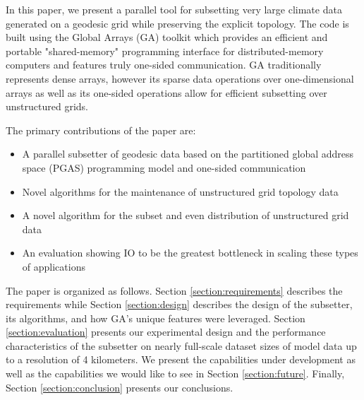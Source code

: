 In this paper, we present a parallel tool for subsetting very large climate
data generated on a geodesic grid while preserving the explicit topology.  The
code is built using the Global Arrays (GA) toolkit\cite{GA} which provides an
efficient and portable "shared-memory" programming interface for
distributed-memory computers and features truly one-sided communication.  GA
traditionally represents dense arrays, however its sparse data operations over
one-dimensional arrays as well as its one-sided operations allow for efficient
subsetting over unstructured grids.

The primary contributions of the paper are:
\begin{itemize}
\item A parallel subsetter of geodesic data based on the partitioned global
address space (PGAS) programming model and one-sided communication
\item Novel algorithms for the maintenance of unstructured grid topology data
\item A novel algorithm for the subset and even distribution of unstructured grid data
\item An evaluation showing IO to be the greatest bottleneck in scaling these types of applications
\end{itemize}

The paper is organized as follows.  Section \ref{section:requirements}
describes the requirements while Section \ref{section:design} describes the
design of the subsetter, its algorithms, and how GA's unique features were
leveraged.  Section \ref{section:evaluation} presents our experimental design
and the performance characteristics of the subsetter on nearly full-scale
dataset sizes of model data up to a resolution of 4 kilometers.  We present
the capabilities under development as well as the capabilities we would like
to see in Section \ref{section:future}.  Finally, Section
\ref{section:conclusion} presents our conclusions.
